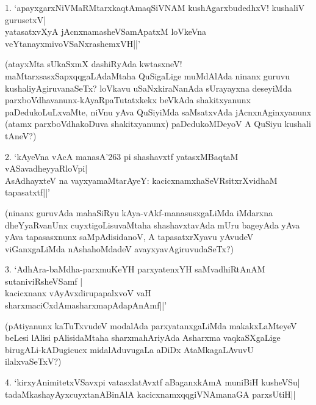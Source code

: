 \begin{itemize}


\begin{shloka}
\item[1.]\qquad `apayxgarxNiVMaRMtarxkaqtAmaqSiVNAM kushAgarxbudedhxV! kushaliV gurusetxV|\\
\qquad yatasatxvXyA jAcnxnamasheVSamApatxM loVkeVna veYtanayxmivoVSaNxrashemxVH||'
\end{shloka}

(atayxMta sUkaSxmX dashiRyAda kwtasxneV! maMtarxsasxSapxqqgaLAdaMtaha QuSigaLige muMdAlAda ninanx guruvu kushaliyAgiruvanaSeTx? loVkavu uSaNxkiraNanAda sUrayayxna deseyiMda parxboVdhavanunx-kAyaRpaTutatxkekx beVkAda shakitxyanunx paDedukoLuLxvaMte, niVnu yAva QuSiyiMda saMsatxvAda jAcnxnAginxyanunx (atamx parxboVdhakoDuva shakitxyanunx) paDedukoMDeyoV A QuSiyu kushali tAneV?)


\begin{shloka}
\item[2.] \qquad `kAyeVna vAcA manasA\char'263 pi shashavxtf yatasxMBaqtaM vASavadheyyaRloVpi|\\
\qquad AsAdhayxteV na vayxyamaMtarAyeY: kacicxnamxhaSeVRsitxrXvidhaM tapasatxtf||'
\end{shloka}

(ninanx guruvAda mahaSiRyu kAya-vAkf-manasusxgaLiMda iMdarxna dheYyaRvanUnx cuyxtigoLisuvaMtaha shashavxtavAda mUru bageyAda yAva yAva tapasasxnunx saMpAdisidanoV, A tapasatxrXyavu yAvudeV viGanxgaLiMda nAshahoMdadeV avayxyavAgiruvudaSeTx?)

\begin{shloka}
\item[3.] `AdhAra-baMdha-parxmuKeYH parxyatenxYH saMvadhiRtAnAM sutaniviRsheVSamf |\\
kacicxnanx vAyAvxdirupapalxvoV vaH sharxmaciCxdAmasharxmapAdapAnAmf||'
\end{shloka}

(pAtiyanunx kaTuTxvudeV modalAda parxyatanxgaLiMda makakxLaMteyeV beLesi lAlisi pAlisidaMtaha sharxmahAriyAda Asharxma vaqkaSXgaLige birugALi-kADugicucx midalAduvugaLa aDiDx AtaMkagaLAvuvU ilalxvaSeTxV?)

\begin{shloka}
\item[4.] `kirxyAnimitetxVSavxpi vatasxlatAvxtf aBaganxkAmA muniBiH kusheVSu|\\
tadaMkashayAyxcuyxtanABinAlA kacicxnamxqqgiVNAmanaGA parxsUtiH||
\end{shloka}


\end{itemize}
